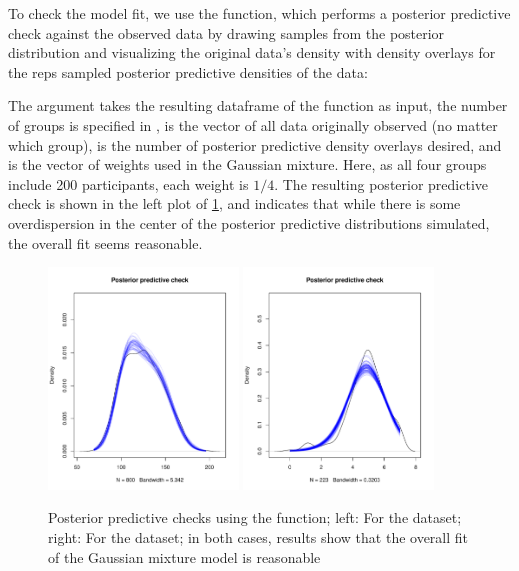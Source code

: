 To check the model fit, we use the  function, which performs a posterior predictive check against the observed data by drawing  samples from the posterior distribution and visualizing the original data's density with density overlays for the reps sampled posterior predictive densities of the data:
The argument  takes the resulting dataframe of the  function as input, the number of groups is specified in ,  is the vector of all data originally observed (no matter which group),  is the number of posterior predictive density overlays desired, and  is the vector of weights used in the Gaussian mixture. Here, as all four groups include 200 participants, each weight is $1/4$. The resulting posterior predictive check is shown in the left plot of  \ref{fig:ppchecks}, and indicates that while there is some overdispersion in the center of the posterior predictive distributions simulated, the overall fit seems reasonable.
\begin{figure}[h!]
\centering
\includegraphics[width=0.45\textwidth]{ppcheckRunners}
\includegraphics[width=0.45\textwidth]{ppcheckFeelings}
\caption{Posterior predictive checks using the  function; left: For the  dataset; right: For the  dataset; in both cases, results show that the overall fit of the Gaussian mixture model is reasonable}
\label{fig:ppchecks}
\end{figure}



